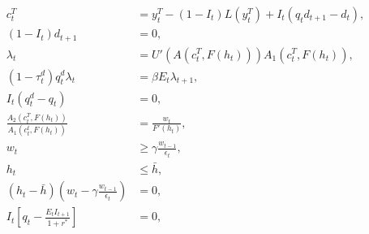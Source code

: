 \begin{align}
    c^T_t &= y^T_t - (1 - I_t)L(y^T_t) + I_t(q_t d_{t+1} - d_t), \\
    (1 - I_t)d_{t+1} &= 0, \\
    \lambda_t &= U'(A(c^T_t, F(h_t)))A_1(c_t^T, F(h_t)),\\
    (1-\tau_t^d)q_t^d \lambda_t &= \beta E_t \lambda_{t+1}, \\
    I_t(q^d_t - q_t) &= 0, \\
    \frac{A_2(c_t^T, F(h_t))}{A_1(c_t^t, F(h_t))} &= \frac{w_t}{F'(h_t)} , \\
   w_t &\ge \gamma\frac{w_{t-1}}{\epsilon_t},\\
   h_t &\le \bar{h},\\
   \left( h_t - \bar{h} \right) \left( w_t - \gamma\frac{w_{t-1}}{\epsilon_t}\right) &= 0, \\
    I_t \left[ q_t - \frac{E_t I_{t+1}}{1+r^*} \right] &= 0,
\end{align}